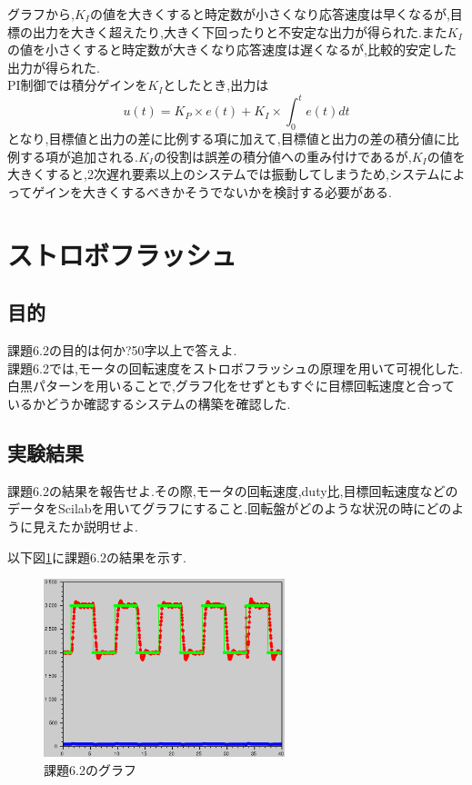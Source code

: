 \documentclass{jarticle}
\begin{document}
グラフから,$K_I$の値を大きくすると時定数が小さくなり応答速度は早くなるが,目標の出力を大きく超えたり,大きく下回ったりと不安定な出力が得られた.また$K_I$の値を小さくすると時定数が大きくなり応答速度は遅くなるが,比較的安定した出力が得られた. \\
PI制御では積分ゲインを$K_I$としたとき,出力は
\begin{equation}
u(t) = K_P \times e(t) + K_I \times \int_0^t e(t) dt
\end{equation}
となり,目標値と出力の差に比例する項に加えて,目標値と出力の差の積分値に比例する項が追加される.$K_I$の役割は誤差の積分値への重み付けであるが,$K_I$の値を大きくすると,2次遅れ要素以上のシステムでは振動してしまうため,システムによってゲインを大きくするべきかそうでないかを検討する必要がある.

\section{ストロボフラッシュ}
\subsection{目的}
課題6.2の目的は何か?50字以上で答えよ. \\

課題6.2では,モータの回転速度をストロボフラッシュの原理を用いて可視化した.白黒パターンを用いることで,グラフ化をせずともすぐに目標回転速度と合っているかどうか確認するシステムの構築を確認した.

\subsection{実験結果}
課題6.2の結果を報告せよ.その際,モータの回転速度,duty比,目標回転速度などのデータをScilabを用いてグラフにすること.回転盤がどのような状況の時にどのように見えたか説明せよ.

以下図\ref{fig:kadai6-2}に課題6.2の結果を示す.

\begin{figure}[H]
\begin{center}
\includegraphics[width=7.0cm]{images/kadai6-2.eps}
\caption{課題6.2のグラフ}
\label{fig:kadai6-2}
\end{center}
\end{figure}
\end{document}
